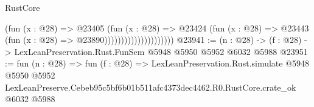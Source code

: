 \begin{lexlean}{RustCore}
\begin{coremodule}
                                      (fun (x : @28) =>
                                      @23405
                                        (fun (x : @28) =>
                                        @23424
                                          (fun (x : @28) =>
                                          @23443 (fun (x : @28) => @23890)))))))))))))))))))))
@23941 := (n : @28) -> (f : @28) -> LexLeanPreservation.Rust.FunSem @5948 @5950 @5952 @6032 @5988
@23951 := fun (n : @28) =>
  fun (f : @28) =>
  LexLeanPreservation.Rust.simulate
    @5948
    @5950
    @5952
    LexLeanPreserve.Cebeb95c5bf6b01b511afc4373dec4462.R0.RustCore.crate_ok
    @6032
    @5988
\end{coremodule}
\end{lexlean}
